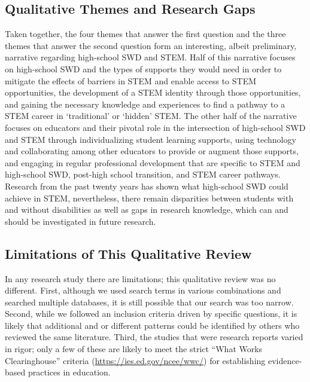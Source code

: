 \documentclass[11.5pt]{sig-alternate}
\begin{document}
\begin{large}
\subsection*{Qualitative Themes and Research Gaps}
Taken together, the four themes that answer the first question and the three themes that answer the second question form an interesting, albeit preliminary, narrative regarding high-school SWD and STEM. Half of this narrative focuses on high-school SWD and the types of supports they would need in order to mitigate the effects of barriers in STEM and enable access to STEM opportunities, the development of a STEM identity through those opportunities, and gaining the necessary knowledge and experiences to find a pathway to a STEM career in ‘traditional’ or ‘hidden’ STEM. The other half of the narrative focuses on educators and their pivotal role in the intersection of high-school SWD and STEM through individualizing student learning supports, using technology and collaborating among other educators to provide or augment those supports, and engaging in regular professional development that are specific to STEM and high-school SWD, post-high school transition, and STEM career pathways. Research from the past twenty years has shown what high-school SWD could achieve in STEM, nevertheless, there remain disparities between students with and without disabilities as well as gaps in research knowledge, which can and should be investigated in future research.

\subsection*{Limitations of This Qualitative Review}
In any research study there are limitations; this qualitative review was no different. First, although we used search terms in various combinations and searched multiple databases, it is still possible that our search was too narrow. Second, while we followed an inclusion criteria driven by specific questions, it is likely that additional and or different patterns could be identified by others who reviewed the same literature. Third, the studies that were research reports varied in rigor; only a few of these are likely to meet the strict “What Works Clearinghouse” criteria (\url{https://ies.ed.gov/ncee/wwc/}) for establishing evidence-based practices in education.   


\end{large}
\end{document}
